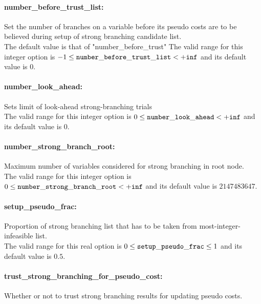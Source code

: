 \paragraph{\bf number\_before\_trust\_list:}\label{sec:number_before_trust_list} Set the number of branches on a variable before its pseudo costs are to be believed during setup of strong branching candidate list. $\;$ \\
 The default value is that of
"number\_before\_trust" The valid range for this integer option is
$-1 \le {\tt number\_before\_trust\_list } <  {\tt +inf}$
and its default value is $0$.


\paragraph{\bf number\_look\_ahead:}\label{sec:number_look_ahead} Sets limit of look-ahead strong-branching trials $\;$ \\
 The valid range for this integer option is
$0 \le {\tt number\_look\_ahead } <  {\tt +inf}$
and its default value is $0$.


\paragraph{\bf number\_strong\_branch\_root:}\label{sec:number_strong_branch_root} Maximum number of variables considered for strong branching in root node. $\;$ \\
 The valid range for this integer option is
$0 \le {\tt number\_strong\_branch\_root } <  {\tt +inf}$
and its default value is $2147483647$.


\paragraph{\bf setup\_pseudo\_frac:}\label{sec:setup_pseudo_frac} Proportion of strong branching list that has to be taken from most-integer-infeasible list. $\;$ \\
 The valid range for this real option is 
$0 \le {\tt setup\_pseudo\_frac } \le 1$
and its default value is $0.5$.


\paragraph{\bf trust\_strong\_branching\_for\_pseudo\_cost:}\label{sec:trust_strong_branching_for_pseudo_cost} Whether or not to trust strong branching results for updating pseudo costs. $\;$ \\


